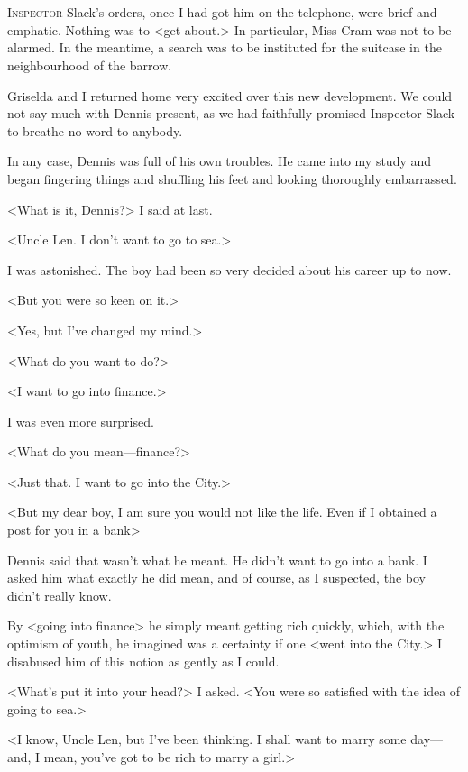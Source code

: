 \chapter[Chapter  \thechapter]{}


\lettrine{I}{nspector} Slack's orders, once I had got him on the telephone, were brief and emphatic. Nothing was to <get about.> In particular, Miss Cram was not to be alarmed. In the meantime, a search was to be instituted for the suitcase in the neighbourhood of the barrow.

Griselda and I returned home very excited over this new development. We could not say much with Dennis present, as we had faithfully promised Inspector Slack to breathe no word to anybody.

In any case, Dennis was full of his own troubles. He came into my study and began fingering things and shuffling his feet and looking thoroughly embarrassed.

<What is it, Dennis?> I said at last.

<Uncle Len. I don't want to go to sea.>

I was astonished. The boy had been so very decided about his career up to now.

<But you were so keen on it.>

<Yes, but I've changed my mind.>

<What do you want to do?>

<I want to go into finance.>

I was even more surprised.

<What do you mean—finance?>

<Just that. I want to go into the City.>

<But my dear boy, I am sure you would not like the life. Even if I obtained a post for you in a bank\longdash>

Dennis said that wasn't what he meant. He didn't want to go into a bank. I asked him what exactly he did mean, and of course, as I suspected, the boy didn't really know.

By <going into finance> he simply meant getting rich quickly, which, with the optimism of youth, he imagined was a certainty if one <went into the City.> I disabused him of this notion as gently as I could.

<What's put it into your head?> I asked. <You were so satisfied with the idea of going to sea.>

<I know, Uncle Len, but I've been thinking. I shall want to marry some day—and, I mean, you've got to be rich to marry a girl.>

